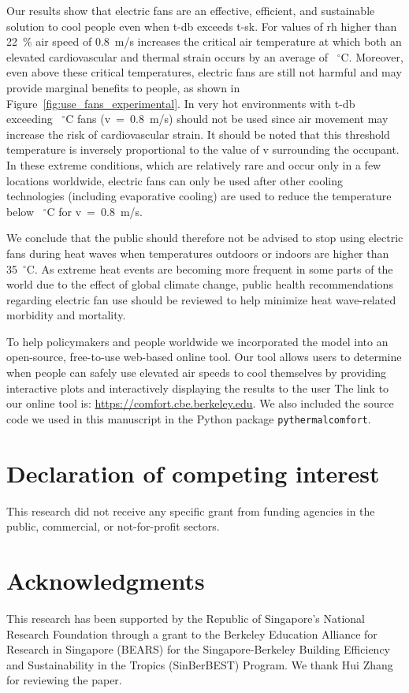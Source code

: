 Our results show that electric fans are an effective, efficient, and sustainable solution to cool people even when \ac{t-db} exceeds \ac{t-sk}.
For values of \ac{rh} higher than 22~\% air speed of 0.8~m/s increases the critical air temperature at which both an elevated cardiovascular and thermal strain occurs by an average of ~$^{\circ}$C\@.
Moreover, even above these critical temperatures, electric fans are still not harmful and may provide marginal benefits to people, as shown in Figure~\ref{fig:use_fans_experimental}.
In very hot environments with \ac{t-db} exceeding ~$^{\circ}$C fans (\acf{v}~=~0.8~m/s) should not be used since air movement may increase the risk of cardiovascular strain.
It should be noted that this threshold temperature is inversely proportional to the value of \ac{v} surrounding the occupant.
In these extreme conditions, which are relatively rare and occur only in a few locations worldwide, electric fans can only be used after other cooling technologies (including evaporative cooling) are used to reduce the temperature below ~$^{\circ}$C for \ac{v}~=~0.8~m/s.

We conclude that the public should therefore not be advised to stop using electric fans during heat waves when temperatures outdoors or indoors are higher than 35~$^{\circ}$C\@.
As extreme heat events are becoming more frequent in some parts of the world due to the effect of global climate change, public health recommendations regarding electric fan use should be reviewed to help minimize heat wave-related morbidity and mortality.

To help policymakers and people worldwide we incorporated the model into an open-source, free-to-use web-based online tool.
Our tool allows users to determine when people can safely use elevated air speeds to cool themselves by providing interactive plots and interactively displaying the results to the user
The link to our online tool is: \url{https://comfort.cbe.berkeley.edu}.
We also included the source code we used in this manuscript in the Python package \verb|pythermalcomfort|.

\section{Declaration of competing interest}\label{sec:declaration-of-competing-interest}
This research did not receive any specific grant from funding agencies in the public, commercial, or not-for-profit sectors.

\section{Acknowledgments}\label{sec:acknowledgments}
This research has been supported by the Republic of Singapore's National Research Foundation through a grant to the Berkeley Education Alliance for Research in Singapore (BEARS) for the Singapore-Berkeley Building Efficiency and Sustainability in the Tropics (SinBerBEST) Program.
We thank Hui Zhang for reviewing the paper.